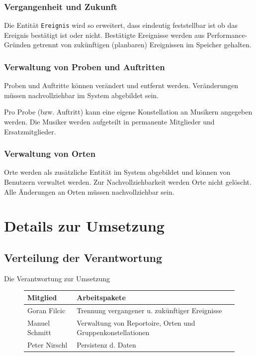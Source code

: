 \documentclass[12pt,oneside,a4paper]{scrartcl}
\begin{document}
\subsubsection*{Vergangenheit und Zukunft}
Die Entität \texttt{Ereignis} wird so erweitert, dass eindeutig feststellbar ist ob das Ereignis bestätigt ist oder nicht.
Bestätigte Ereignisse werden aus Performance-Gründen getrennt von zukünftigen (planbaren) Ereignissen im Speicher gehalten.


\subsubsection*{Verwaltung von Proben und Auftritten}
Proben und Auftritte können verändert und entfernt werden. Veränderungen müssen nachvollziehbar im System abgebildet sein.

Pro Probe (bzw. Auftritt) kann eine eigene Konstellation an Musikern angegeben werden.
Die Musiker werden aufgeteilt in permanente Mitglieder und Ersatzmitglieder.


\subsubsection*{Verwaltung von Orten}
Orte werden als zusätzliche Entität im System abgebildet und können von Benutzern verwaltet werden.
Zur Nachvollziehbarkeit werden Orte nicht gelöscht. Alle Änderungen an Orten müssen nachvollziehbar sein.


\section{Details zur Umsetzung}
\subsection{Verteilung der Verantwortung}
Die Verantwortung zur Umsetzung 
 
\begin{figure}[h!]
    \begin{tabular}{l|l}
        Mitglied       & Arbeitspakete \\ \hline \hline
        Goran Filcic   & Trennung vergangener u. zukünftiger Ereignisse \\ 
        Manuel Schmitt & Verwaltung von Reportoire, Orten und Gruppenkonstellationen\\ 
        Peter Nirschl  & Persistenz d. Daten \\
    \end{tabular}
\end{figure}
\end{document}
